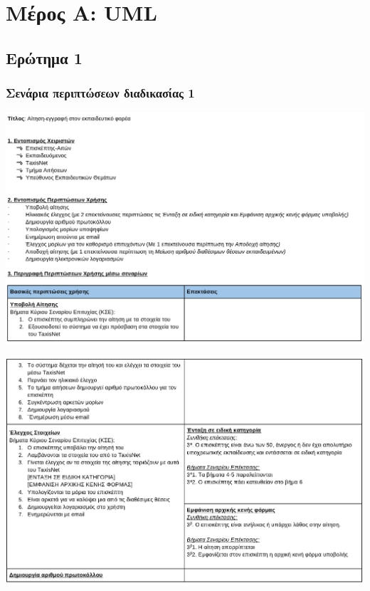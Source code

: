 \documentclass[a4paper, titlepage, twoside]{article}
\begin{document}
\section{Μέρος Α: UML}
\label{sec:org3f2e860}

\subsection{Ερώτημα 1}
\label{sec:org9f504ba}

\subsubsection*{Σενάρια περιπτώσεων διαδικασίας 1}
\label{sec:orgc184958}

\begin{center}
\includegraphics[width=.9\linewidth]{2023-05-31_23-27-36_screenshot.png}
\end{center}
\begin{center}
\includegraphics[width=.9\linewidth]{2023-05-31_23-27-45_screenshot.png}
\end{center}
\end{document}
